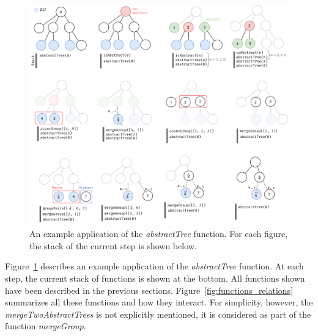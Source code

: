 \begin{figure}[]
  \centering
  \includegraphics[width=0.8\linewidth]{appstract/explanations/steps_abstractTree}
  \caption{An example application of the \emph{abstractTree} function. For each figure, the stack of the current step is shown below.}
  \label{fig:steps_abstractTree}
\end{figure}

Figure~\ref{fig:steps_abstractTree} describes an example application of the \emph{abstractTree} function.
At each step, the current stack of functions is shown at the bottom.
All functions shown have been described in the previous sections.
Figure~\ref{fig:functions_relations} summarizes all these functions and how they interact.
For simplicity, however, the \emph{mergeTwoAbstractTrees} is not explicitly mentioned, it is considered as part of the function \emph{mergeGroup}.




